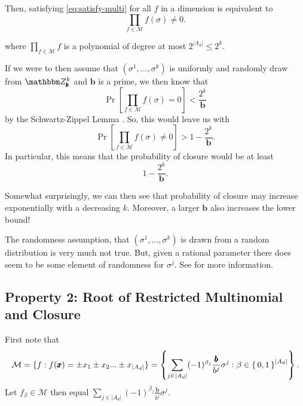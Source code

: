 \documentclass[11pt,titlepage]{article}
\newcommand{\digSumPeriodic}{\sigma^j}
\newcommand{\digSumPeriodicNoJ}{{\sigma}}
\newcommand{\commonBase}{{\pmb{b}}}
\newcommand{\numbToCommon}{\frac{\commonBase}{b^j}}
\begin{document}
Then, satisfying \eqref{eq:satisfy-multi} for all $f$ in a dimension is equivalent to
$$
  \prod_{f \in \mathcal{M}} f(\digSumPeriodicNoJ) \neq 0.
$$

where $\prod_{f \in \mathcal{M}} f$ is a polynomial of degree
at most $2^{|A_d|} \leq 2^k$.

If we were to then assume that $(\digSumPeriodicNoJ^1, ..., \digSumPeriodicNoJ^k)$ 
is uniformly and randomly draw from $\Z_\commonBase^k$ and $\commonBase$ is a prime, we then know that
$$
  \Pr\left[\prod_{f \in \mathcal{M}} f(\digSumPeriodicNoJ) = 0\right] < \frac{2^k}{\commonBase}
$$
by the Schwartz-Zippel Lemma \cite{Shwartz} \cite{Zip}.
So, this would leave us with
$$
  \Pr\left[\prod_{f \in \mathcal{M}} f(\digSumPeriodicNoJ) \neq 0\right] > 1 - \frac{2^k}{\commonBase}.
$$
In particular, this means that the probability of closure would be at least
$$
1 - \frac{2^k}{\commonBase}.
$$

Somewhat surprisingly, we can then see that probability of closure may increase exponentially
with a decreasing $k$. Moreover, a larger $\commonBase$ also increases the lower bound!

\begin{remark}
\label{remark:digSumRandomness}
  The randomness assumption, that $(\digSumPeriodicNoJ^1, ..., \digSumPeriodicNoJ^k)$
  is drawn from a random distribution is very much not true. But, given a rational parameter
  there does seem to be some element of randomness for $\digSumPeriodic$. See \cite{OnDecSeq} for more information.
\end{remark}

\subsection{Property 2: Root of Restricted Multinomial and Closure}
First note that
$$
\mathcal{M} = \{f : f(\pmb{x}) = \pm x_1 \pm x_2 ... \pm x_{|A_d|}\} = 
  \left\{\sum_{j \in |A_d|} (-1)^{\beta_j} \numbToCommon \digSumPeriodic : \beta \in \set{0, 1}^{|A_d|} \right\}.
$$
Let $f_\beta \in \mathcal{M}$ then equal $\sum_{j \in |A_d|} (-1)^{\beta_j}\numbToCommon \digSumPeriodic$.
\end{document}
